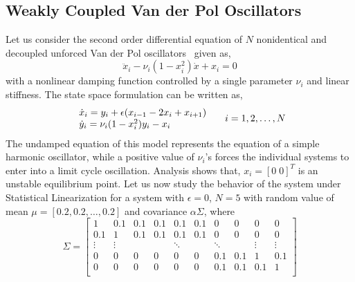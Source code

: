 \subsection{Weakly Coupled Van der Pol Oscillators}
Let us consider the second order differential equation of $N$ nonidentical and decoupled unforced Van der Pol oscillators~\cite{van1920theory} given as, 
\begin{equation}
\ddot{x}_i - \nu_i (1-x_i^2) \dot{x} + x_i = 0
\end{equation}
with a nonlinear damping function controlled by a single parameter $\nu_i$ and linear stiffness. The state space  formulation can be written as,
\begin{equation}
\label{weak_vanderpol}
\begin{array}{l}
\dot{x}_i = y_i + \epsilon (x_{i-1} - 2x_i + x_{i+1}) \\
\dot{y}_i = \nu_i(1-x_i^2)y_i - x_i  
\end{array}\hspace{5 mm} i = 1,2,\ldots,N
\end{equation}
The undamped equation of this model represents the equation of a simple harmonic oscillator, while a positive value of $\nu_i$'s forces the individual systems to enter into a limit cycle oscillation. Analysis shows that, $x_i = [0 \; 0]^T$ is an unstable equilibrium point. Let us now study the behavior of the system under Statistical Linearization for a system with $\epsilon = 0$, $N = 5$ with random value of mean $\mu = [0.2, 0.2, \ldots, 0.2]$ and covariance $ \alpha \Sigma$, where 
\begin{equation}
\Sigma = \begin{bmatrix}
1 & 0.1 & 0.1 & 0.1 & 0.1 & 0.1 & 0 & 0 & 0 & 0 \\
0.1 & 1 & 0.1 & 0.1 & 0.1 & 0.1 & 0 & 0 & 0 & 0 \\
\vdots & \vdots & &  & \ddots & & \ddots    & & \vdots & \vdots \\
0 & 0 & 0 & 0 & 0 & 0 & 0.1 & 0.1 & 1 & 0.1 \\
0 & 0 & 0 & 0 & 0 & 0 & 0.1 & 0.1 & 0.1 & 1 \\
\end{bmatrix}
\end{equation}

